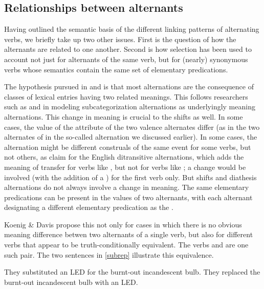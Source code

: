 \documentclass[output=paper
                ,modfonts
                ,nonflat
	        ,collection
	        ,collectionchapter
	        ,collectiontoclongg
 	        ,biblatex
                ,babelshorthands
                ,newtxmath
                ,draftmode
                ,colorlinks, citecolor=brown
]{./langsci/langscibook}
\begin{document}
\subsection{Relationships between alternants}

Having outlined the semantic basis of the different linking patterns of alternating verbs, we briefly take up two other issues.
First is the question of how the alternants are related to one another.
Second is how  selection has been used to account not just for alternants of the same verb, but for (nearly) synonymous verbs whose semantics contain the same set of elementary predications.

The hypothesis pursued in \citet{Davis1996} and \citet{Davis2001}  is that 
most alternations are the consequence of classes of lexical entries having
two related meanings. This follows researchers such as \citet{Pinker1989} and \citet{Levin1993} in modeling subcategorization alternations as underlyingly meaning alternations. 
This change in meaning is crucial to the \citet{KoenigandDavis2006}  shifts as well. In some cases, the value of the \rels attribute of the two valence alternates differ (as in the two alternates of  in the so-called  alternation we discussed earlier).
In some cases, the alternation might be different construals of the same event for some verbs, but not others, as \citet{RappaportandLevin2008} claim for the English ditransitive  alternations, which adds the meaning of transfer for verbs like , but not for verbs like ; a  change would be involved (with the addition of a ) for the first verb only. But  shifts and diathesis alternations do not always involve a change in meaning. The same elementary predications can be present in the  values of two alternants, with each alternant designating a different elementary predication as the . 

Koenig \& Davis propose this not only for cases in which there is no obvious meaning difference betwen two alternants of a single verb, but also for different verbs that appear to be truth-conditionally equivalent.
The verbs  and  are one such pair.
The two sentences in \ref{subrep} illustrate this equivalence.

\begin{exe}
\ex\label{subrep}
\begin{xlist}
\ex\label{subrepa}They substituted an LED for the burnt-out incandescent bulb.
\ex\label{subrepb}They replaced the burnt-out incandescent bulb with an LED.
\end{xlist}
\end{exe}
\end{document}
